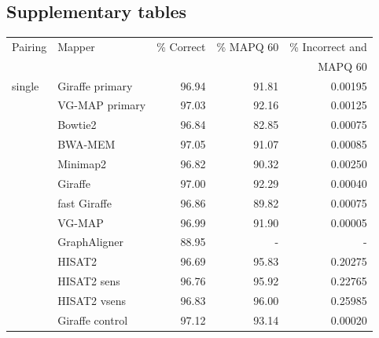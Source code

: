 \documentclass[11pt]{ucscthesis}
\newcommand{\faDownload}{X}
\newcommand{\indexurl}[1]{\href{#1}{\faDownload}}
\begin{document}
\subsection{Supplementary tables}


\newcommand{\mapindexes}[1]{\indexurl{#1.xg} & \indexurl{#1.gcsa} & \indexurl{#1.gcsa.lcp} & & & &}
\newcommand{\giraffeindexes}[1]{\indexurl{#1.xg} & & & \indexurl{#1.gbwt} & \indexurl{#1.min} & \indexurl{#1.gg} & \indexurl{#1.dist}}

\begin{table}[p]
    \centering
    \begin{tabular}{|l|l|r|r|r|}
    \hline
        Pairing & Mapper & \% Correct & \% MAPQ 60 & \% Incorrect and  \\
              &         &            &            & MAPQ 60           \\
        \hline
        single  & Giraffe primary	    & 96.94     & 91.81     & 0.00195 \\
                & VG-MAP primary        & 97.03     & 92.16     & 0.00125 \\
                & Bowtie2	            & 96.84     & 82.85     & 0.00075 \\
                & BWA-MEM	            & 97.05     & 91.07     & 0.00085 \\
                & Minimap2	            & 96.82     & 90.32     & 0.00250 \\
                & Giraffe	            & 97.00     & 92.29     & 0.00040 \\
                & fast Giraffe	        & 96.86     & 89.82     & 0.00075 \\
                & VG-MAP               	& 96.99     & 91.90     & 0.00005 \\
                & GraphAligner	        & 88.95     & -         & - \\
                & HISAT2	            & 96.69     & 95.83     & 0.20275 \\
                & HISAT2 sens       	& 96.76     & 95.92     & 0.22765 \\
                & HISAT2 vsens	        & 96.83     & 96.00     & 0.25985 \\
                & Giraffe control	    & 97.12     & 93.14     & 0.00020 \\


\end{tabular}
\end{table}
\end{document}
